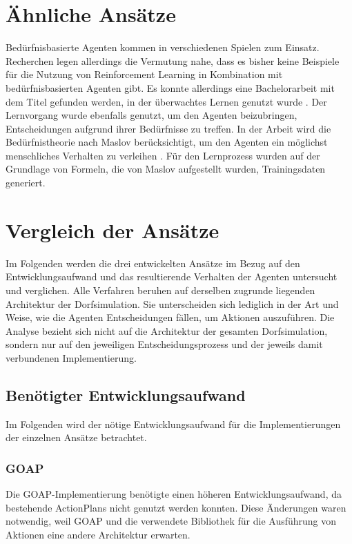\section{Ähnliche Ansätze}\label{schliecker}
Bedürfnisbasierte Agenten kommen in verschiedenen Spielen zum Einsatz. Recherchen legen allerdings die Vermutung nahe, dass es bisher keine Beispiele für die Nutzung von Reinforcement Learning in Kombination mit bedürfnisbasierten Agenten gibt. Es konnte allerdings eine Bachelorarbeit mit dem Titel  gefunden werden, in der überwachtes Lernen genutzt wurde \cite{dorf_agents_kevin}. Der Lernvorgang wurde ebenfalls genutzt, um den Agenten beizubringen, Entscheidungen aufgrund ihrer Bedürfnisse zu treffen. In der Arbeit wird die Bedürfnistheorie nach Maslov berücksichtigt, um den Agenten ein möglichst menschliches Verhalten zu verleihen \cite{maslov_needs}. Für den Lernprozess wurden auf der Grundlage von Formeln, die von Maslov aufgestellt wurden, Trainingsdaten generiert.




\section{Vergleich der Ansätze}
Im Folgenden werden die drei entwickelten Ansätze im Bezug auf den Entwicklungsaufwand und das resultierende Verhalten der Agenten untersucht und verglichen. Alle Verfahren beruhen auf derselben zugrunde liegenden Architektur der Dorfsimulation. Sie unterscheiden sich lediglich in der Art und Weise, wie die Agenten Entscheidungen fällen, um Aktionen auszuführen. Die Analyse bezieht sich nicht auf die Architektur der gesamten Dorfsimulation, sondern nur auf den jeweiligen Entscheidungsprozess und der jeweils damit verbundenen Implementierung.

\subsection{Benötigter Entwicklungsaufwand}
Im Folgenden wird der nötige Entwicklungsaufwand für die Implementierungen der einzelnen Ansätze betrachtet.


\subsubsection{GOAP}
Die GOAP-Implementierung benötigte einen höheren Entwicklungsaufwand, da bestehende ActionPlans nicht genutzt werden konnten. Diese Änderungen waren notwendig, weil GOAP und die verwendete Bibliothek für die Ausführung von Aktionen eine andere Architektur erwarten. 

